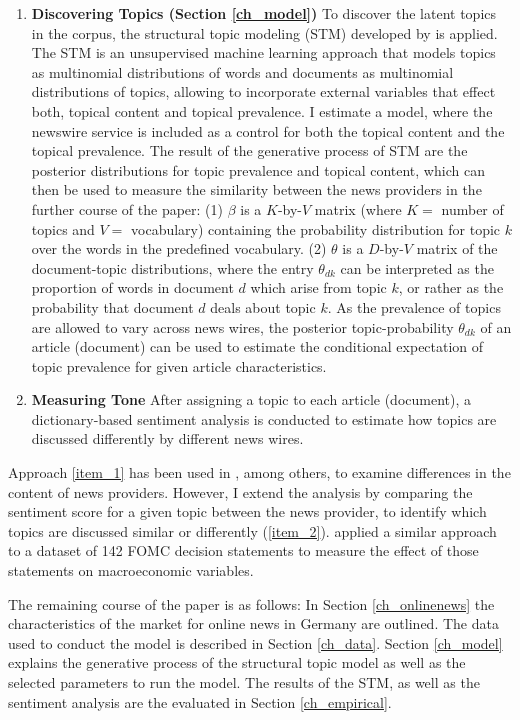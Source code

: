 \documentclass[12pt,a4paper,notitlepage]{article}
\begin{document}
\begin{enumerate}
	\item \textbf{Discovering Topics (Section \ref{ch_model})} To discover the latent topics in the corpus, the structural topic modeling (STM) developed by \citet{roberts_model_2016} is applied. The STM is an unsupervised machine learning approach that models topics as multinomial distributions of words and documents as multinomial distributions of topics, allowing to incorporate external variables that effect both, topical content and topical prevalence. I estimate a model, where the newswire service is included as a control for both the topical content and the topical prevalence. The result of the generative process of STM are the posterior distributions for topic prevalence and topical content, which can then be used to measure the similarity between the news providers in the further course of the paper: (1) $\beta$ is a $K$-by-$V$ matrix (where $K=$ number of topics and $V=$ vocabulary) containing the probability distribution for topic $k$ over the words in the predefined vocabulary. (2) $\theta$ is a $D$-by-$V$ matrix of the document-topic distributions, where the entry $\theta_{dk}$ can be interpreted as the proportion of words in document $d$ which arise from topic $k$, or rather as the probability that document $d$ deals about topic $k$. As the prevalence of topics are allowed to vary across news wires, the posterior topic-probability $\theta_{dk}$ of an article (document) can be used to estimate the conditional expectation of topic prevalence for given article characteristics. 
	 
	\item \textbf{Measuring Tone} After assigning a topic to each article (document), a dictionary-based sentiment analysis is conducted to estimate how topics are discussed differently by different news wires.
	
\end{enumerate}

Approach \ref{item_1} has been used in \citet{roberts_model_2016}, among others, to examine differences in the content of news providers. However, I extend the analysis by comparing the sentiment score for a given topic between the news provider, to identify which topics are discussed similar or differently (\ref{item_2}). \citet{hansen_shocking_2016} applied a similar approach to a dataset of 142 FOMC decision statements to measure the effect of those statements on macroeconomic variables. 

The remaining course of the paper is as follows: In Section \ref{ch_onlinenews} the characteristics of the market for online news in Germany are outlined. The data used to conduct the model is described in Section \ref{ch_data}. Section \ref{ch_model} explains the generative process of the structural topic model as well as the selected parameters to run the model. The results of the STM, as well as the sentiment analysis are the evaluated in Section \ref{ch_empirical}. 
 
\end{document}

